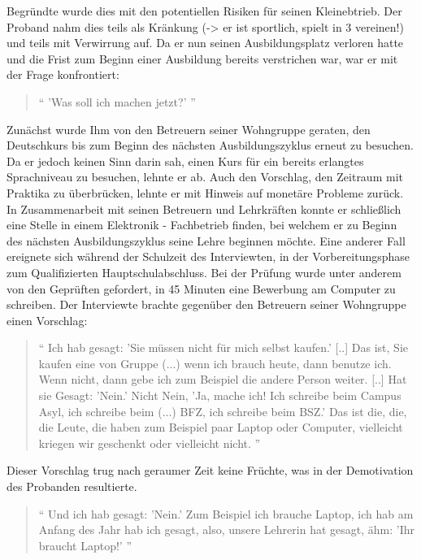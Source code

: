 Begründte wurde dies mit den potentiellen Risiken für seinen Kleinebtrieb. Der Proband nahm dies teils als Kränkung (-> er ist sportlich, spielt in 3 vereinen!) und teils mit Verwirrung auf.\newline
Da er nun seinen Ausbildungsplatz verloren hatte und die Frist zum Beginn einer Ausbildung bereits verstrichen war, war er mit der Frage konfrontiert:
\begin{quote}
    `` 'Was soll ich machen jetzt?' ''
\end{quote}
Zunächst wurde Ihm von den Betreuern seiner Wohngruppe geraten, den Deutschkurs bis zum Beginn des nächsten Ausbildungszyklus erneut zu besuchen. Da er jedoch keinen Sinn darin sah, einen Kurs für ein bereits erlangtes Sprachniveau zu besuchen, lehnte er ab. Auch den Vorschlag, den Zeitraum mit Praktika zu überbrücken, lehnte er mit Hinweis auf monetäre Probleme zurück.\newline
In Zusammenarbeit mit seinen Betreuern und Lehrkräften konnte er schließlich eine Stelle in einem Elektronik - Fachbetrieb finden, bei welchem er zu Beginn des nächsten Ausbildungszyklus seine Lehre beginnen möchte.\newline
Eine anderer Fall ereignete sich während der Schulzeit des Interviewten, in der Vorbereitungsphase zum Qualifizierten Hauptschulabschluss. Bei der Prüfung wurde unter anderem von den Geprüften gefordert, in 45 Minuten eine Bewerbung am Computer zu schreiben.
Der Interviewte brachte gegenüber den Betreuern seiner Wohngruppe einen Vorschlag:
\begin{quote}
    `` Ich hab gesagt: 'Sie müssen nicht für mich selbst kaufen.' [..] Das ist, Sie kaufen eine von Gruppe (...) wenn ich brauch heute, dann benutze ich. Wenn nicht, dann gebe ich zum Beispiel die andere Person weiter. [..] Hat sie Gesagt: 'Nein.' Nicht Nein, 'Ja, mache ich! Ich schreibe beim Campus Asyl, ich schreibe beim (...) BFZ, ich schreibe beim BSZ.' Das ist die, die, die Leute, die haben zum Beispiel paar Laptop oder Computer, vielleicht kriegen wir geschenkt oder vielleicht nicht. ''
\end{quote}
Dieser Vorschlag trug nach geraumer Zeit keine Früchte, was in der Demotivation des Probanden resultierte.
\begin{quote}
    `` Und ich hab gesagt: 'Nein.' Zum Beispiel ich brauche Laptop, ich hab am Anfang des Jahr hab ich gesagt, also, unsere Lehrerin hat gesagt, ähm: 'Ihr braucht Laptop!' ''
\end{quote}
